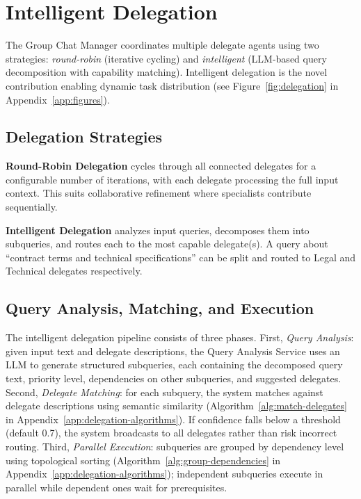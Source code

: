 \documentclass[11pt]{article}
\begin{document}
\section{Intelligent Delegation}
\label{sec:delegation}

The Group Chat Manager coordinates multiple delegate agents using two strategies: \textit{round-robin} (iterative cycling) and \textit{intelligent} (LLM-based query decomposition with capability matching). Intelligent delegation is the novel contribution enabling dynamic task distribution (see Figure~\ref{fig:delegation} in Appendix~\ref{app:figures}).

\subsection{Delegation Strategies}

\textbf{Round-Robin Delegation} cycles through all connected delegates for a configurable number of iterations, with each delegate processing the full input context. This suits collaborative refinement where specialists contribute sequentially.

\textbf{Intelligent Delegation} analyzes input queries, decomposes them into subqueries, and routes each to the most capable delegate(s). A query about ``contract terms and technical specifications'' can be split and routed to Legal and Technical delegates respectively.

\subsection{Query Analysis, Matching, and Execution}

The intelligent delegation pipeline consists of three phases. First, \textit{Query Analysis}: given input text and delegate descriptions, the Query Analysis Service uses an LLM to generate structured subqueries, each containing the decomposed query text, priority level, dependencies on other subqueries, and suggested delegates. Second, \textit{Delegate Matching}: for each subquery, the system matches against delegate descriptions using semantic similarity (Algorithm~\ref{alg:match-delegates} in Appendix~\ref{app:delegation-algorithms}). If confidence falls below a threshold (default 0.7), the system broadcasts to all delegates rather than risk incorrect routing. Third, \textit{Parallel Execution}: subqueries are grouped by dependency level using topological sorting (Algorithm~\ref{alg:group-dependencies} in Appendix~\ref{app:delegation-algorithms}); independent subqueries execute in parallel while dependent ones wait for prerequisites.
\end{document}
